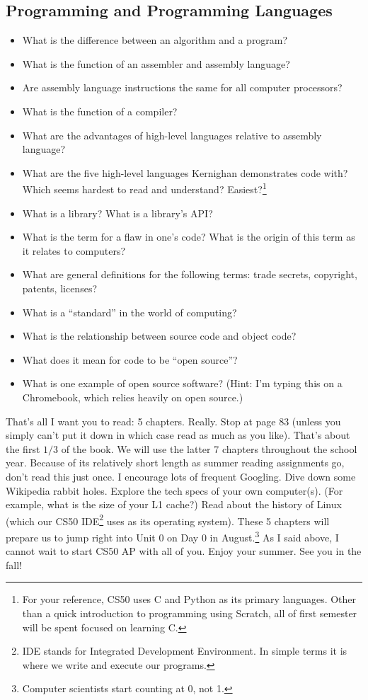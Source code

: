 \documentclass[12pt]{article}
\begin{document}
\subsection*{Programming and Programming Languages}
\begin{itemize}
	\item What is the difference between an algorithm and a program?
	\item What is the function of an assembler and assembly language?
	\item Are assembly language instructions the same for all computer processors?
	\item What is the function of a compiler?
	\item What are the advantages of high-level languages relative to assembly language?
	\item What are the five high-level languages Kernighan demonstrates code with? Which seems hardest to read and understand? Easiest?\footnote{For your reference, CS50 uses C and Python as its primary languages. Other than a quick introduction to programming using Scratch, all of first semester will be spent focused on learning C.}
	\item What is a library? What is a library's API?
	\item What is the term for a flaw in one's code? What is the origin of this term as it relates to computers?
	\item What are general definitions for the following terms: trade secrets, copyright, patents, licenses?
	\item What is a ``standard'' in the world of computing?
	\item What is the relationship between source code and object code?
	\item What does it mean for code to be ``open source''?
	\item What is one example of open source software? (Hint: I'm typing this on a Chromebook, which relies heavily on open source.)
\end{itemize}

That's all I want you to read: 5 chapters. Really. Stop at page 83 (unless you simply can't put it down in which case read as much as you like). That's about the first $1/3$ of the book. We will use the latter 7 chapters throughout the school year. Because of its relatively short length as summer reading assignments go, don't read this just once. I encourage lots of frequent Googling. Dive down some Wikipedia rabbit holes. Explore the tech specs of your own computer(s). (For example, what is the size of your L1 cache?) Read about the history of Linux (which our CS50 IDE\footnote{IDE stands for Integrated Development Environment. In simple terms it is where we write and execute our programs.} uses as its operating system). These 5 chapters will prepare us to jump right into Unit 0 on Day 0 in August.\footnote{Computer scientists start counting at 0, not 1.} As I said above, I cannot wait to start CS50 AP with all of you. Enjoy your summer. See you in the fall!
\end{document}
